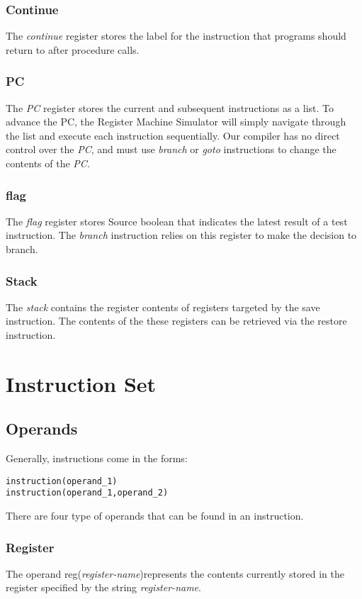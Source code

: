\subsubsection{Continue}
The \textit{continue} register stores the label for the instruction that programs should return to after procedure calls.

\subsubsection{PC}
The \textit{PC} register stores the current and subsequent instructions as a list. To advance the PC, the Register Machine Simulator will simply navigate through the list and execute each instruction sequentially. Our compiler has no direct control over the \textit{PC}, and must use \textit{branch} or \textit{goto} instructions to change the contents of the \textit{PC}.\newline


\subsubsection{flag}
The \textit{flag} register stores Source boolean that indicates the latest result of a test instruction. The \textit{branch} instruction relies on this register to make the decision to branch.\newline

\subsubsection{Stack}
The \textit{stack} contains the register contents of registers targeted by the save instruction. The contents of the these registers can be retrieved via the restore instruction.\newline


\section{Instruction Set}
\subsection{Operands}
Generally, instructions come in the forms:
\begin{lstlisting}
instruction(operand_1)
instruction(operand_1,operand_2)
\end{lstlisting}
There are four type of operands that can be found in an instruction.
\subsubsection{Register}
The operand reg(\textit{register-name})represents the contents currently stored in the register specified by the string \textit{register-name}.


